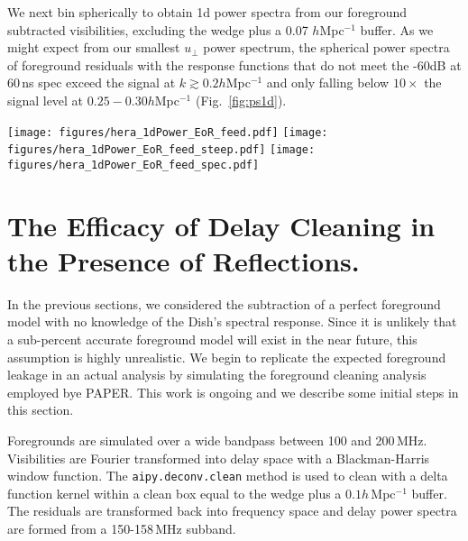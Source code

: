 \documentclass[useAMS,usenatbib]{mn2e}
\begin{document}
We next bin spherically to obtain 1d power spectra from our foreground subtracted visibilities, excluding the wedge plus a 0.07 $h$Mpc$^{-1}$ buffer. As we might expect from our smallest $u_\perp$ power spectrum, the spherical power spectra of foreground residuals with the response functions that do not meet the -60dB at 60\,ns spec exceed the signal at $k\gtrsim 0.2h$Mpc$^{-1}$ and only falling below $10\times$ the signal level at $0.25-0.30h$Mpc$^{-1}$ (Fig.~\ref{fig:ps1d}). 

\begin{figure*}
\texttt{[image: figures/hera\_1dPower\_EoR\_feed.pdf]}
\texttt{[image: figures/hera\_1dPower\_EoR\_feed\_steep.pdf]}
\texttt{[image: figures/hera\_1dPower\_EoR\_feed\_spec.pdf]}
\caption{Spherically binned power spectra excluding the wedge plus a 0.07 $h$Mpc$^{-1}$ buffer of the 21\,cm signal (black line) and the visibilities resulting from the subtraction of a foreground model without the delay response of the instrument (blue line). In the left panel, we show the residuals for the delay response extrapolated by an exponential, in the middle an exponential with a steep ($\times 3$ time constant, and the right, the response function scaled by a power law so that it meets the -60\,dB at 60\,ns spec.}
\label{fig:ps1d}
\end{figure*}


\section{The Efficacy of Delay Cleaning in the Presence of Reflections.}
In the previous sections, we considered the subtraction of a perfect foreground model with no knowledge of the Dish's spectral response. Since it is unlikely that a sub-percent accurate foreground model will exist in the near future, this assumption is highly unrealistic. We begin to replicate the expected foreground leakage in an actual analysis by simulating the foreground cleaning analysis employed bye PAPER. This work is ongoing and we describe some initial steps in this section. 

Foregrounds are simulated over a wide bandpass between 100 and 200\,MHz. Visibilities are Fourier transformed into delay space with a Blackman-Harris window function. The {\tt aipy.deconv.clean} method is used to clean with a delta function kernel within a clean box equal to the wedge plus a $0.1 h$\,Mpc$^{-1}$ buffer. The residuals are transformed back into frequency space and delay power spectra are formed from a 150-158\,MHz subband.
\end{document}

